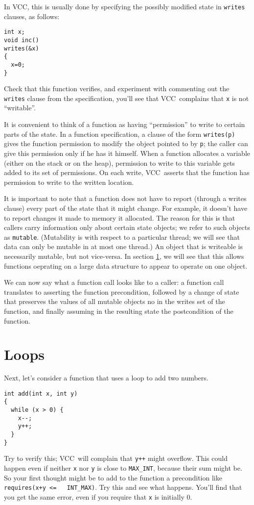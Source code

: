 \documentclass{report}
\newcommand{\Q}[1]{\lstinline~#1~}
\newcommand{\VCC}{VCC}
\newcommand{\Ref}[1]{section \ref{#1}}
\begin{document}
In \VCC, this is usually done by specifying the possibly modified
state in \Q{writes} clauses, as follows:
\begin{lstlisting}
int x;
void inc() 
writes(&x)
{
  x=0;
}
\end{lstlisting}
Check that this function verifies, and experiment with commenting out
the \Q{writes} clause from the specification, you'll see that
\VCC\ complains that \Q{x} is not ``writable''. 

It is convenient to think of a function as having ``permission'' to
write to certain parts of the state. In a function specification, a
clause of the form \Q{writes(p)} gives the function permission to
modify the object pointed to by \Q{p}; the caller can give this
permission only if he has it himself.  When a function allocates a
variable (either on the stack or on the heap), permission to write to
this variable gets added to its set of permissions. On each write,
\VCC\ asserts that the function has permission to write to the written
location.

It is important to note that a function does not have to report
(through a writes clause) every part of the state that it might
change. For example, it doesn't have to report changes it made to
memory it allocated. The reason for this is that callers carry
information only about certain state objects; we refer to such objects
as \Q{mutable}. (Mutability is with respect to a particular thread; we
will see that data can only be mutable in at most one thread.) An
object that is writeable is necessarily mutable, but not vice-versa.
In \Ref{}, we will see that this allows functions oeprating
on a large data structure to appear to operate on one object.

We can now say what a function call looks like to a caller: a function
call translates to asserting the function precondition, followed by a
change of state that preserves the values of all mutable objects no in
the writes set of the function, and finally assuming in the resulting
state the postcondition of the function.

\section{Loops}
Next, let's consider a function that uses a loop to add two numbers.
\begin{lstlisting}
int add(int x, int y)
{
  while (x > 0) {
    x--;
    y++;
  }
}
\end{lstlisting}
Try to verify this; \VCC\ will complain that \Q{y++} might
overflow. This could happen even if neither \Q{x} nor \Q{y} is close
to \Q{MAX_INT}, because their sum might be. So your first thought
might be to add to the function a precondition like \Q{requires(x+y <=
  INT_MAX)}. Try this and see what happens. You'll find that you get
the same error, even if you require that \Q{x} is initially 0.
\end{document}
